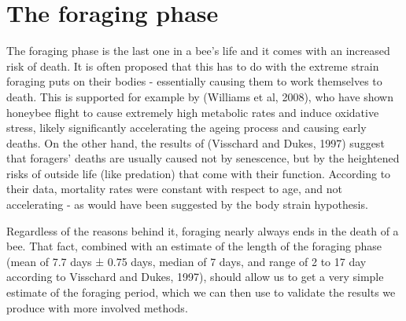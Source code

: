 \section{The foraging phase}
The foraging phase is the last one in a bee’s life and it comes with an increased risk of death. 
It is often proposed that this has to do with the extreme strain foraging puts on their bodies - 
essentially causing them to work themselves to death. This is supported for example by (Williams et al, 2008), 
who have shown honeybee flight to cause extremely high metabolic rates and induce oxidative stress, 
likely significantly accelerating the ageing process and causing early deaths. On the other hand, 
the results of \citep{Aup91} (Visschard and Dukes, 1997) suggest that foragers’ deaths are usually caused not by senescence, 
but by the heightened risks of outside life (like predation) that come with their function. 
According to their data, mortality rates were constant with respect to age, and not accelerating - 
as would have been suggested by the body strain hypothesis. 

Regardless of the reasons behind it, foraging nearly always ends in the death of a bee. 
That fact, combined with an estimate of the length of the foraging phase 
(mean of 7.7 days ± 0.75 days, median of 7 days, and range of 2 to 17 day according to \citep{Aup91} Visschard and Dukes, 1997), 
should allow us to get a very simple estimate of the foraging period, which we can then use to validate the results 
we produce with more involved methods.
